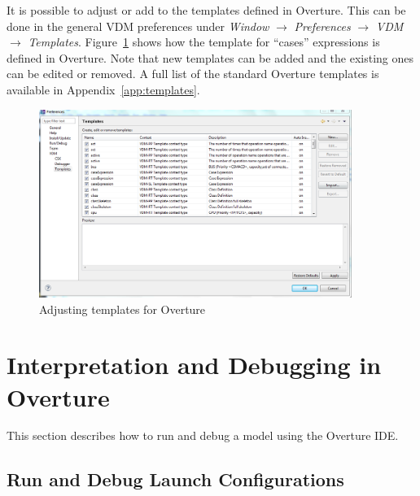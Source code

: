 \documentclass{overturerepchap}
\begin{document}
It is possible to adjust or add to the templates defined in 
Overture. This can be done in the general VDM preferences under
\emph{Window} $\rightarrow$ \emph{Preferences} $\rightarrow$ \emph{VDM}
$\rightarrow$ \emph{Templates}. Figure~\ref{fig:Templatepreferences} shows
how the template for ``cases'' expressions is defined in Overture. Note
that new templates can be added and the existing ones can be
edited or removed. A full list of the
standard Overture templates is available in Appendix~\ref{app:templates}.

\begin{figure}
\begin{center}
\includegraphics[width=4in]{screendumps/templatesRT}
\caption{Adjusting templates for Overture}
\label{fig:Templatepreferences}
\end{center}
\end{figure}

\chapter{Interpretation and Debugging in Overture}\label{sec:debug}

This section describes how to run and debug a model using the Overture IDE. 

\section{Run and Debug Launch Configurations}\label{sec:launchmodes}
\end{document}
